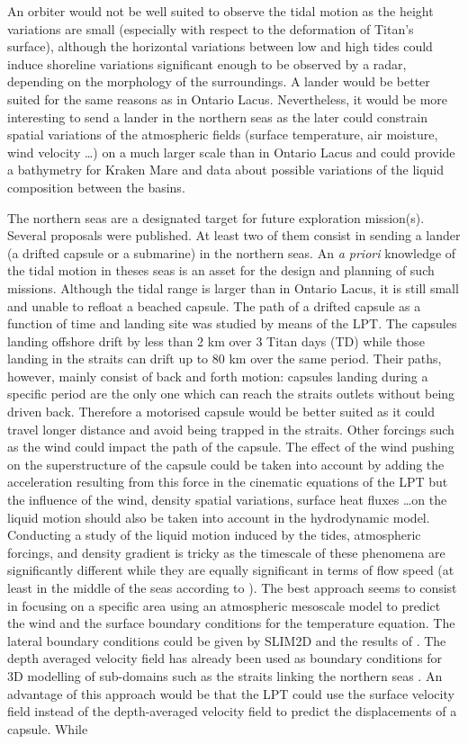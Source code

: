 An orbiter would not be well suited to observe the tidal motion as the height variations are small (especially with respect to the deformation of Titan's surface), although the horizontal variations between low and high tides could induce shoreline variations significant enough to be observed by a radar, depending on the morphology of the surroundings. A lander would be better suited for the same reasons as in Ontario Lacus. Nevertheless, it would be more interesting to send a lander in the northern seas as the later could constrain spatial variations of the atmospheric fields (surface temperature, air moisture, wind velocity \dots) on a much larger scale than in Ontario Lacus and could provide a bathymetry for Kraken Mare and data about possible variations of the liquid composition between the basins.


The northern seas are a designated target for future exploration mission(s). Several proposals were published. At least two of them consist in sending a lander (a drifted capsule or a submarine) in the northern seas. An \textit{a priori} knowledge of the tidal motion in theses seas is an asset for the design and planning of such missions. Although the tidal range is larger than in Ontario Lacus, it is still small and unable to refloat a beached capsule. The path of a drifted capsule as a function of time and landing site was studied by means of the LPT. The capsules landing offshore drift by less than 2 km over 3 Titan days (TD) while those landing in the straits can drift up to 80 km over the same period. Their paths, however, mainly consist of back and forth motion: capsules landing during a specific period are the only one which can reach the straits outlets without being driven back. Therefore a motorised capsule would be better suited as it could travel longer distance and avoid being trapped in the straits. Other forcings such as the wind could impact the path of the capsule. The effect of the wind pushing on the superstructure of the capsule could be taken into account by adding the acceleration resulting from this force in the cinematic equations of the LPT but the influence of the wind, density spatial variations, surface heat fluxes \dots on the liquid motion should also be taken into account in the hydrodynamic model. Conducting a study of the liquid motion induced by the tides, atmospheric forcings, and density gradient is tricky as the timescale of these phenomena are significantly different while they are equally significant in terms of flow speed (at least in the middle of the seas according to \cite{tokano2015wind,tokano2015sun}). The best approach seems to consist in focusing on a specific area using an atmospheric mesoscale model to predict the wind and the surface boundary conditions for the temperature equation. The lateral boundary conditions could be given by SLIM2D and the results of \cite{tokano2015wind,tokano2015sun}. The depth averaged velocity field has already been used as boundary conditions for 3D modelling of sub-domains such as the straits linking the northern seas \citep[see][]{vincent2017study}. An advantage of this approach would be that the LPT could use the surface velocity field instead of the depth-averaged velocity field to predict the displacements of a capsule. While 